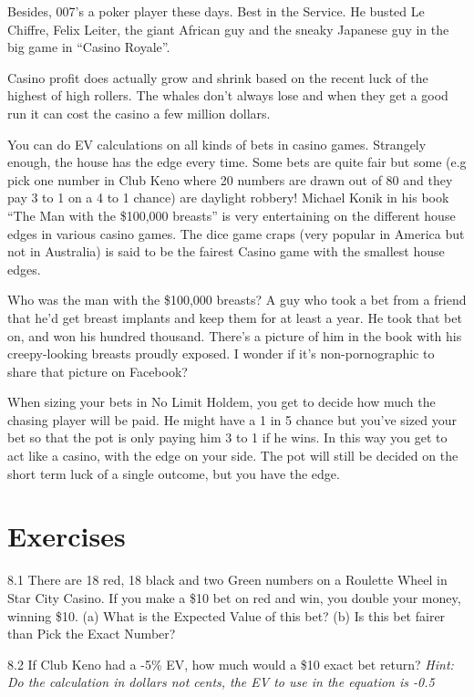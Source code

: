 Besides, 007's a poker player these days. Best in the Service.
He busted Le Chiffre, Felix Leiter, the giant African guy and
the sneaky Japanese guy in the big game in ``Casino Royale''.

Casino profit does actually grow and shrink based on the recent luck
of the highest of high rollers. The whales don't always lose and when
they get a good run it can cost the casino a few million dollars.

You can do EV calculations on all kinds of bets in casino games.
Strangely enough, the house has the edge every time. Some bets
are quite fair but some (e.g pick one number in Club Keno
where 20 numbers are drawn out of 80 and they pay
3 to 1 on a 4 to 1 chance) are daylight robbery! Michael Konik
in his book ``The Man with the \$100,000 breasts'' is very
entertaining on the different house edges in various casino games. The
dice game craps (very popular in America but not in Australia)
is said to be the fairest Casino game with the smallest house edges.

Who was the man with the \$100,000 breasts? A guy who took a bet from
a friend that he'd get breast implants and keep them for at least a
year. He took that bet on, and won his hundred thousand. There's a
picture of him in the book with his creepy-looking breasts proudly
exposed. I wonder if it's non-pornographic to share that picture on
Facebook?

When sizing your bets in No Limit Holdem, you get to decide how much
the chasing player will be paid. He might have a 1 in 5 chance
but you've sized your bet so that the pot is only paying him 3 to 1
if he wins. In this way you get to act like a casino, with the edge
on your side. The pot will still be decided on the short term luck
of a single outcome, but you have the edge.

\section{Exercises}


8.1 There are 18 red, 18 black and two Green numbers on a Roulette
Wheel in Star City Casino. If you make a \$10 bet on red and win, you
double your money, winning \$10. (a) What is the Expected Value of
this bet? (b) Is this bet fairer than Pick the Exact Number?

8.2 If Club Keno had a -5\% EV, how much would a \$10 exact bet
return? \textit{Hint: Do the calculation in dollars not cents, the EV
to use in the equation is -0.5}
